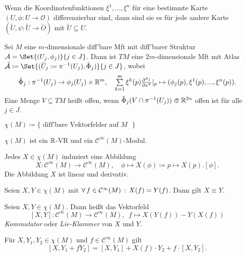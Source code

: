 \documentclass{cheat-sheet}
\renewcommand{\O}{\mathcal{O}} %
\newcommand{\A}{\mathcal{A}} %
\begin{document}
\begin{lem}
  Wenn die Koordinatenfunktionen $\xi^1, ..., \xi^n$ für eine bestimmte Karte $(U, \phi : U \to \O)$ differenzierbar sind, dann sind sie es für jede andere Karte $(\tilde{U}, \psi : \tilde{U} \to \tilde{O})$ mit $\tilde{U} \subseteq U$.
\end{lem}

\begin{defn}
  Sei $M$ eine $m$-dimensionale diff'bare Mft mit diff'barer Struktur $\A = \Set{(U_j, \phi_j)}{j \in J}$. Dann ist $TM$ eine $2m$-dimensionale Mft mit Atlas $\tilde{\A} \coloneqq \Set{(\tilde{U}_j \coloneqq \pi^{-1}(U_j), \tilde{\Phi}_j)}{j \in J}$, wobei
  \[
    \tilde{\Phi}_j : \pi^{-1}(U_j) \to \phi_j(U_j) \times \R^m, \quad
    \sum_{k=1}^m \xi^k(p) \tfrac{\partial^{\phi_j}}{\partial x^k}|_p \mapsto (\phi_j(p), \xi^1(p), ..., \xi^n(p)).
  \]
  Eine Menge $V \subseteq TM$ heißt offen, wenn $\tilde{\Phi}_j(V \cap \pi^{-1}(U_j)) \opn \R^{2n}$ offen ist für alle $j \in J$.
\end{defn}

\begin{nota}
  $\chi(M) \coloneqq \{\text{ diff'bare Vektorfelder auf $M$ }\}$
\end{nota}

\begin{bem}
  $\chi(M)$ ist ein $\mathbb{R}$-VR und ein $\mathcal{C}^\infty(M)$-Modul.
\end{bem}

\begin{lem}
  Jedes $X \in \chi(M)$ induziert eine Abbildung
  \[
    X : \mathcal{C}^\infty(M) \to \mathcal{C}^\infty(M), \quad
    \phi \mapsto X(\phi) \coloneqq p \mapsto X(p) . [\phi].
  \]
  Die Abbildung $X$ ist linear und derivativ.
\end{lem}

\begin{lem}
  Seien $X, Y \in \chi(M)$ mit $\forall \, {f \in \mathcal{C}^\infty(M)} \,:\, X(f) = Y(f)$. Dann gilt $X \equiv Y$.
\end{lem}

\begin{defn}
  Seien $X, Y \in \chi(M)$. Dann heißt das Vektorfeld
  \[
    [X, Y] : \mathcal{C}^\infty(M) \to \mathcal{C}^\infty(M), \enspace
    f \mapsto X(Y(f)) - Y(X(f))
  \]
  \emph{Kommutator} oder \emph{Lie-Klammer} von $X$ und $Y$.
\end{defn}

\begin{satz}
  Für $X, Y_1, Y_2 \in \chi(M)$ und $f \in \mathcal{C}^\infty(M)$ gilt
  \[ [X, Y_1 + f Y_2] = [X, Y_1] + X(f) \cdot Y_2 + f \cdot [X, Y_2]. \]
\end{satz}
\end{document}
